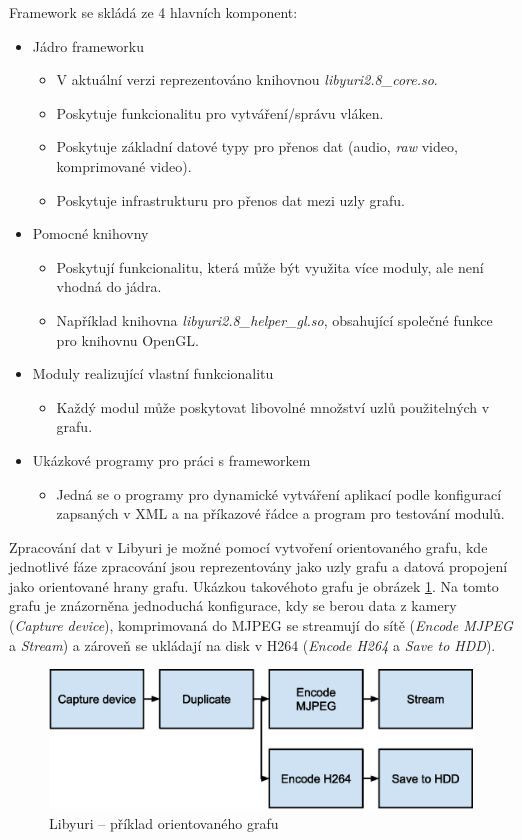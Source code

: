 \documentclass[thesis=M,czech]{FITthesis}[2012/06/26]
\begin{document}
Framework se skládá ze 4 hlavních komponent:
\begin{itemize}
\item Jádro frameworku
  \begin{itemize}
  	\item V aktuální verzi reprezentováno knihovnou \textit{libyuri2.8\_core.so}.
    \item Poskytuje funkcionalitu pro vytváření/správu vláken.
    \item Poskytuje základní datové typy pro přenos dat (audio, \textit{raw} video, komprimované video).
    \item Poskytuje infrastrukturu pro přenos dat mezi uzly grafu.
  \end{itemize}
\item Pomocné knihovny
  \begin{itemize}
    \item Poskytují funkcionalitu, která může být využita více moduly, ale není vhodná do jádra.
  	\item Například knihovna \textit{libyuri2.8\_helper\_gl.so}, obsahující společné funkce pro knihovnu OpenGL.
  \end{itemize}
\item Moduly realizující vlastní funkcionalitu
  \begin{itemize}
    \item Každý modul může poskytovat libovolné množství uzlů použitelných v grafu.
  \end{itemize}
\item Ukázkové programy pro práci s frameworkem
  \begin{itemize}
    \item Jedná se o programy pro dynamické vytváření aplikací podle konfigurací zapsaných v XML a na příkazové řádce a program pro testování modulů.
  \end{itemize}
\end{itemize}

Zpracování dat v Libyuri je možné pomocí vytvoření orientovaného grafu, kde jednotlivé fáze zpracování jsou reprezentovány jako uzly grafu a datová propojení jako orientované hrany grafu. Ukázkou takovéhoto grafu je obrázek \ref{img:yuri_example}.
Na tomto grafu je znázorněna jednoduchá konfigurace, kdy se berou data z kamery (\textit{Capture device}), komprimovaná do MJPEG  se streamují do sítě (\textit{Encode MJPEG} a \textit{Stream}) a zároveň se ukládají na disk v H264 (\textit{Encode H264} a \textit{Save to HDD}).
\\
\begin{figure}[h]\centering
	\includegraphics[width=1\textwidth]{images/yuri_example.eps}
	\caption{Libyuri -- příklad orientovaného grafu}\label{img:yuri_example}
\end{figure}
\end{document}
